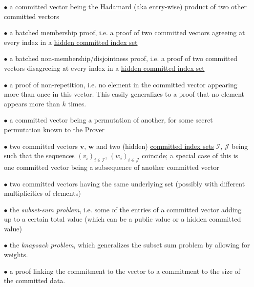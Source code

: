 \documentclass[11pt, lettersize, notitlepage, leqno, footskip=0.6cm]{article}
\newcommand{\mc}{\mathcal}
\newcommand{\mbf}{\mathbf}
\newcommand{\noin}{\noindent}
\numberwithin{equation}{section}
\begin{document}
\noin $\bullet$ a committed vector being the \hyperlink{HadProd}{Hadamard} (aka entry-wise) product of two other committed vectors \vspace{1mm}

\noin $\bullet$ a batched membership proof, i.e. a proof of two committed vectors agreeing at every index in a \hyperlink{Indices}{hidden committed index set} \vspace{1mm}

\noin $\bullet$ a batched non-membership/disjointness proof, i.e. a proof of two committed vectors disagreeing at every index in a \hyperlink{Indices}{hidden committed index set} \vspace{1mm}

\noin $\bullet$ a proof of non-repetition, i.e. no element in the committed vector appearing more than once in this vector. This easily generalizes to a proof that no element appears more than $k$ times. \vspace{1mm}

\noin $\bullet$ a committed vector being a permutation of another, for some secret permutation known to the Prover \vspace{1mm}

\noin $\bullet$ two committed vectors $\mbf{v}$, $\mbf{w}$ and two (hidden) \hyperlink{Indices}{committed index sets} $\mc{I}$, $\mc{J}$ being such that the sequences $(v_i)_{i\in \mc{I}}$, $(w_i)_{i\in \mc{J}}$ coincide; a special case of this is one committed vector being a subsequence of another committed vector \vspace{1mm}

\noin $\bullet$ two committed vectors having the same underlying set (possibly with different multiplicities of elements) \vspace{1mm}

\noin $\bullet$ the \textit{subset-sum problem}, i.e.  some of the entries of a committed vector adding up to a certain total value (which can be a public value or a hidden committed value) \vspace{1mm}

\noin $\bullet$ the \textit{knapsack problem}, which generalizes the subset sum problem by allowing for weights. \vspace{1mm}


\noin $\bullet$ a proof linking the commitment to the vector to a commitment to the size of the committed data. \vspace{1mm}


\end{document}
